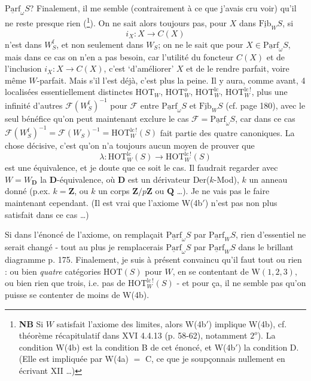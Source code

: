 \documentclass[11pt]{article}
\newcommand{\printedpage}[1]{\marginpar{\footnotesize p.~#1}}
\newcommand{\msp}[1]{\marginpar{\footnotesize [#1]}}
\newcommand{\Parf}{\underline{\mathrm{Parf}}}
\newcommand{\Fib}{\underline{\mathrm{Fib}}}
\newcommand{\HOT}{\mathrm{HOT}}
\begin{document}
\printedpage{114}

$\Parf_\omega S$? Finalement, il me semble (contrairement à ce que j'avais cru voir) qu'il ne reste presque rien (\footnote{\textbf{NB} Si $W$ satisfait l'axiome des limites, alors W(4b$'$) implique W(4b), cf. théorème récapitulatif dans XVI 4.4.13 (p. 58-62), notamment $2^{o}$). La condition W(4b) est la condition B de cet énoncé, et W(4b$'$) la condition D. (Elle est impliquée par W(4a) $=$ C, ce que je soupçonnais nullement en écrivant XII \dots)}). On ne sait alors toujours pas, pour $X$ dans $\Fib_W S$, si
\[ i_X : X \longrightarrow C(X) \]
n'est dans $W^{\mathrm{f}}_S$, et non seulement dans $W_S$; on ne le sait que pour $X \in \Parf_\omega S$, mais dans ce cas on n'en a pas besoin, car l'utilité du foncteur $C(X)$ et de l'inclusion $i_X : X \longrightarrow C(X)$, c'est ‘d'améliorer’ $X$ et de le rendre parfait, voire même $W$-parfait. Mais s'il l'est déjà, c'est plus la peine. Il y aura, comme
\msp{page 184}
avant, 4 localisées essentiellement distinctes $\HOT_W$, $\HOT^{o}_W$, $\HOT^{\mathrm{lc}}_W$, $\HOT^{\mathrm{lc}\,!}_W$, plus une infinité d'autres $\mathcal{F}(W^{\mathrm{f}}_S)^{-1}$ pour $\mathcal{F}$ entre $\Parf_\omega S$ et $\Fib_W S$ (cf. page 180), avec le seul bénéfice qu'on peut maintenant exclure le cas $\mathcal{F} = \Parf_\omega S$, car dans ce cas $\mathcal{F}(W^{\mathrm{f}}_S)^{-1} = \mathcal{F}(W_S)^{-1} = \HOT^{\mathrm{lc}\,!}_W(S)$ fait partie des quatre canoniques. La chose décisive, c'est qu'on n'a toujours aucun moyen de prouver que
\[ \lambda : \HOT^{\mathrm{lc}}_W(S) \longrightarrow \HOT^{\mathrm{lc}\,!}_W(S) \]
est une équivalence, et je doute que ce soit le cas. Il faudrait regarder avec $W = W_{\mathbf{D}}$ la $\mathbf{D}$-équivalence, où $\mathbf{D}$ est un dérivateur Der($k$-Mod), $k$ un anneau donné (p.ex. $k = \mathbf{Z}$, ou $k$ un corps $\mathbf{Z}/p\mathbf{Z}$ ou $\mathbf{Q}$ \dots). Je ne vais pas le faire maintenant cependant. (Il est vrai que l'axiome W(4b$'$) n'est pas non plus satisfait dans ce cas \dots)

Si dans l'énoncé de l'axiome, on remplaçait $\Parf_\omega S$ par $\Parf_W S$, rien d'essentiel ne serait changé - tout au plus je remplacerais $\Parf_\omega S$ par $\Parf_W S$ dans le brillant diagramme p. 175. Finalement, je suis à présent convaincu qu'il faut tout ou rien : ou bien \textit{quatre} catégories $\HOT(S)$ pour $W$, en se contentant de W$(1,2,3)$, ou bien rien que trois, i.e. pas de $\HOT^{\mathrm{lc}\,!}_W(S)$ - et pour ça, il ne semble pas qu'on puisse se contenter de moins de W(4b).
\end{document}
